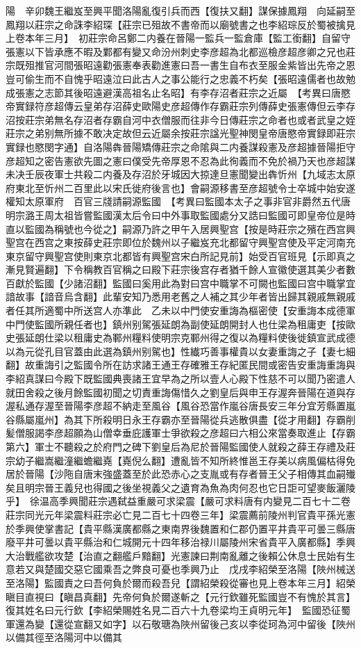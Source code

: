 陽　辛卯魏王繼岌至興平聞洛陽亂復引兵而西【復扶又翻】謀保據鳳翔　向延嗣至鳳翔以莊宗之命誅李紹琛【莊宗已殂故不書帝而以廟號書之也李紹琮反於蜀被擒見上卷本年三月】　初莊宗命呂鄭二内養在晉陽一監兵一監倉庫【監工銜翻】自留守張憲以下皆承應不暇及鄴都有變又命汾州刺史李彦超為北都巡檢彦超彦卿之兄也莊宗既殂推官河間張昭遠勸張憲奉表勸進憲曰吾一書生自布衣至服金紫皆出先帝之恩豈可偷生而不自愧乎昭遠泣曰此古人之事公能行之忠義不朽矣【張昭遠儒者也故勉成張憲之志節其後昭遠避漢高祖名止名昭】有李存沼者莊宗之近屬　【考異曰唐愍帝實録符彦超傳云皇弟存沼薛史歐陽史彦超傳作存霸莊宗列傳薛史張憲傳但云李存沼按莊宗弟無名存沼者存霸自河中衣僧服而往非今日傳莊宗之命者也或者武皇之姪莊宗之弟别無所據不敢决定故但云近屬余按莊宗諡光聖神閔皇帝唐愍帝實録即莊宗實録也愍閔字通】自洛陽犇晉陽矯傳莊宗之命隂與二内養謀殺憲及彦超據晉陽拒守彦超知之密告憲欲先圖之憲曰僕受先帝厚恩不忍為此徇義而不免於禍乃天也彦超謀未决壬辰夜軍士共殺二内養及存沼於牙城因大掠達旦憲聞變出犇忻州【九域志太原府東北至忻州二百里此以宋氏徙府後言也】會嗣源移書至彦超號令士卒城中始安遂權知太原軍府　百官三牋請嗣源監國　【考異曰監國本太子之事非官非爵然五代唐明宗潞王周太祖皆嘗監國漢太后令曰中外事取監國處分又誥曰監國可即皇帝位是時直以監國為稱號也今從之】嗣源乃許之甲午入居興聖宫【按是時莊宗之殯在西宫興聖宫在西宫之東按薛史莊宗即位於魏州以子繼岌充北都留守興聖宫使及平定河南充東京留守興聖宫使則東京北都皆有興聖宫宋白所記見前】始受百官班見【示即真之漸見賢遍翻】下令稱教百官稱之曰殿下莊宗後宫存者猶千餘人宣徽使選其美少者數百獻於監國【少諸沼翻】監國曰奚用此為對曰宫中職掌不可闕也監國曰宫中職掌宜諳故事【諳音烏含翻】此輩安知乃悉用老舊之人補之其少年者皆出歸其親戚無親戚者任其所適蜀中所送宫人亦準此　乙未以中門使安重誨為樞密使【安重誨本成德軍中門使監國所親任者也】鎮州别駕張延朗為副使延朗開封人也仕梁為租庸吏【按歐史張延朗仕梁以租庸史為鄆州糧料使明宗克鄆州得之復以為糧料使後徙鎮宣武成德以為元從孔目官蓋由此選為鎮州别駕也】性纎巧善事權貴以女妻重誨之子【妻七細翻】故重誨引之監國令所在訪求諸王通王存確雅王存紀匿民間或密告安重誨重誨與李紹真謀曰今殿下既監國典喪諸王宜早為之所以壹人心殿下性慈不可以聞乃密遣人就田舍殺之後月餘監國初聞之切責重誨傷惜久之劉皇后與申王存渥奔晉陽在道與存渥私通存渥至晉陽李彦超不納走至風谷【風谷恐當作嵐谷唐長安三年分宜芳縣置嵐谷縣屬嵐州】為其下所殺明日永王存霸亦至晉陽從兵逃散俱盡【從才用翻】存霸削髪僧服謁李彦超願為山僧幸垂庇護軍士爭欲殺之彦超曰六相公來當奏取進止【存霸第六】軍士不聽殺之於府門之碑下劉皇后為尼於晉陽監國使人就殺之薛王存禮及莊宗幼子繼嵩繼潼繼蟾繼嶤【嶤倪么翻】遭亂皆不知所終惟邕王存美以病風偏枯得免居於晉陽【沙陁自唐末強盛蓋至於此恐赤心之支胤或有存者晉王父子相傳其血嗣殱矣且明宗晉王義兒也得國之後坐視義父之遺育為魚為肉何忍也它日詎可望麥飯灑陵乎】　徐温高季興聞莊宗遇弑益重嚴可求梁震【嚴可求料唐有内變見二百七十二卷莊宗同光元年梁震料莊宗必亡見二百七十四卷三年】梁震薦前陵州判官貴平孫光憲於季興使掌書記【貴平縣漢廣都縣之東南界後魏置和仁郡仍置平井貴平可曇三縣唐廢平井可曇以貴平縣治和仁城開元十四年移治禄川屬陵州宋省貴平入廣都縣】季興大治戰艦欲攻楚【治直之翻艦戶黯翻】光憲諫曰荆南亂離之後賴公休息士民始有生意若又與楚國交惡它國乘吾之弊良可憂也季興乃止　戊戌李紹榮至洛陽【陜州械送至洛陽】監國責之曰吾何負於爾而殺吾兒【謂紹榮殺從審也見上卷本年三月】紹榮瞋目直視曰【瞋昌真翻】先帝何負於爾遂斬之【元行欽雖死監國豈不有愧於其言】復其姓名曰元行欽【李紹榮賜姓名見二百六十九卷梁均王貞明元年】　監國恐征蜀軍還為變【還從宣翻又如字】以石敬瑭為陜州留後己亥以李從珂為河中留後【陜州以備其徑至洛陽河中以備其